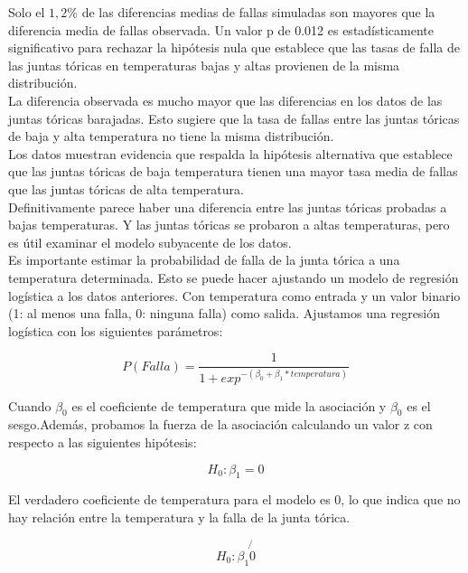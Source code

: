 Solo el $1,2 \%$ de las diferencias medias de fallas simuladas son mayores que
la diferencia media de fallas observada. Un valor p de 0.012 es
estad\'isticamente significativo para rechazar la hip\'otesis nula que establece
que las tasas de falla de las juntas t\'oricas en temperaturas bajas y altas
provienen de la misma distribuci\'on.\\

La diferencia observada es mucho mayor que las diferencias en los datos de las
juntas t\'oricas barajadas. Esto sugiere que la tasa de fallas entre las juntas
t\'oricas de baja y alta temperatura no tiene la misma distribuci\'on. \\Los
datos muestran evidencia que respalda la hip\'otesis alternativa que establece
que las juntas t\'oricas de baja temperatura tienen una mayor tasa media de
fallas que las juntas t\'oricas de alta temperatura.\\

Definitivamente parece haber una diferencia entre las juntas t\'oricas probadas
a bajas temperaturas. Y las juntas t\'oricas se probaron a altas temperaturas,
pero es \'util examinar el modelo subyacente de los datos.\\

Es importante estimar la probabilidad de falla de la junta t\'orica a una
temperatura determinada. Esto se puede hacer ajustando un modelo de regresi\'on
log\'istica a los datos anteriores. Con temperatura como entrada y un valor
binario (1: al menos una falla, 0: ninguna falla) como salida. Ajustamos una
regresi\'on log\'istica con los siguientes par\'ametros:

\begin{equation} 
    P(Falla)= \frac{1}{1+exp^{-(\beta_0+\beta_1*temperatura)}}
\end{equation} 


Cuando $\beta_0$ es el coeficiente de temperatura que mide la asociaci\'on y  
$\beta_0$ es el sesgo.Adem\'as, probamos la fuerza de la asociaci\'on calculando
un valor z con respecto a las siguientes hip\'otesis:


\begin{equation} 
H_0 : \beta_1 = 0
\end{equation} 

El verdadero coeficiente de temperatura para el modelo es 0, lo que indica que
no hay relaci\'on entre la temperatura y la falla de la junta t\'orica.

\begin{equation} 
H_0 : \beta_1 \not {0}
\end{equation} 

